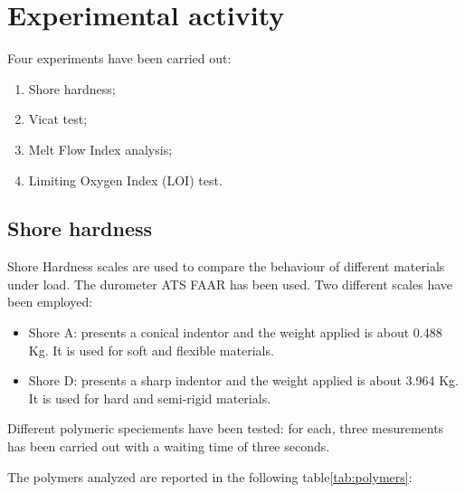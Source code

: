 \documentclass[a4paper, 11pt]{article}
\begin{document}
\section{Experimental activity}

Four  experiments have been carried out: 
\begin{enumerate}
\item Shore hardness;
\item Vicat test;
\item Melt Flow Index analysis;
\item Limiting Oxygen Index (LOI) test.
\end{enumerate}

\subsection{Shore hardness}

Shore Hardness scales are used to compare the behaviour of different materials under load. The durometer ATS FAAR has been used.
Two different scales have been employed:
\begin{itemize}
\item Shore A: presents a conical indentor and the weight applied is about 0.488 Kg. It is used for soft and flexible materials.

\item Shore D: presents a sharp indentor and the weight applied is about 3.964 Kg. It is used for hard and semi-rigid materials.

\end{itemize}

Different polymeric speciements have been tested: for each, three mesurements has been carried out with a waiting time of three seconds.

The polymers analyzed are reported in the following table\ref{tab:polymers}:
\end{document}
